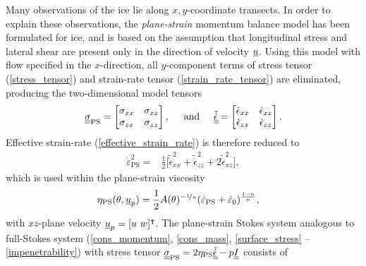 Many observations of the ice lie along $x,y$-coordinate transects.  In order to explain these observations, the \emph{plane-strain} momentum balance model \citep{hill_1950} has been formulated for ice, and is based on the assumption that longitudinal stress and lateral shear are present only in the direction of velocity $\underline{u}$.  Using this model with flow specified in the $x$-direction, all $y$-component terms of stress tensor (\ref{stress_tensor}) and strain-rate tensor (\ref{strain_rate_tensor}) are eliminated, producing the two-dimensional model tensors  
\begin{align}
  \label{ps_tensors}
  \underline{\underline{\sigma}}_{\text{PS}} = \begin{bmatrix}
             \sigma_{xx} & \sigma_{xz} \\
             \sigma_{zx} & \sigma_{zz}
           \end{bmatrix}, \hspace{5mm} \text{and} \hspace{5mm}
  \tilde{\underline{\underline{\dot{\epsilon}}}} = \begin{bmatrix}
                             \dot{\epsilon}_{xx} & \dot{\epsilon}_{xz} \\
                             \dot{\epsilon}_{zx} & \dot{\epsilon}_{zz}
                           \end{bmatrix}.
\end{align}
Effective strain-rate (\ref{effective_strain_rate}) is therefore reduced to
\begin{align}
  \label{ps_effective_strain_rate}
  \dot{\varepsilon}_{\text{PS}}^2 = &\frac{1}{2} \Bigg[ \tilde{\dot{\epsilon}}_{xx}^2 + \tilde{\dot{\epsilon}}_{zz}^2 + 2\tilde{\dot{\epsilon}}_{xz}^2 \Bigg],
\end{align}
which is used within the plane-strain viscosity
\begin{align}
  \label{ps_viscosity}
  \eta_{\text{PS}}(\theta, \underline{u}_p) &= \frac{1}{2}A(\theta)^{-\nicefrac{1}{n}} (\dot{\varepsilon}_{\text{PS}} + \dot{\varepsilon}_0)^{\frac{1-n}{n}},
\end{align} 
with $xz$-plane velocity $\underline{u}_p = [u\ w]^\intercal$.  The plane-strain Stokes system analogous to full-Stokes system (\ref{cons_momentum}, \ref{cons_mass}, \ref{surface_stress} -- \ref{impenetrability}) with stress tensor $\underline{\underline{\sigma}}_{\text{PS}} = 2\eta_{\text{PS}} \tilde{\underline{\underline{\dot{\epsilon}}}} - p \underline{\underline{I}}$ consists of
